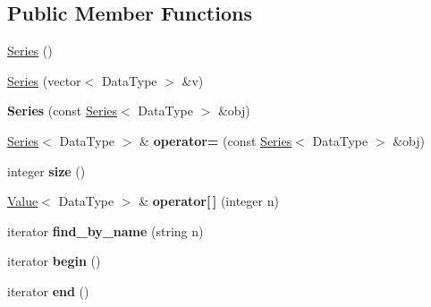 \subsection*{Public Member Functions}
\begin{DoxyCompactItemize}
\item 
\hyperlink{classez_1_1maths_1_1Series_a53985929bac84b0bde2294088e14f175}{Series} ()
\item 
\hyperlink{classez_1_1maths_1_1Series_ad52dec35d6341c5e6971bd24c70fe585}{Series} (vector$<$ Data\+Type $>$ \&v)
\item 
\mbox{\label{classez_1_1maths_1_1Series_a38a4586f46c7a51989206fb69a6c345f}} 
{\bfseries Series} (const \hyperlink{classez_1_1maths_1_1Series}{Series}$<$ Data\+Type $>$ \&obj)
\item 
\mbox{\label{classez_1_1maths_1_1Series_aaee5e146acbd2c0fc89cc777dc3cc891}} 
\hyperlink{classez_1_1maths_1_1Series}{Series}$<$ Data\+Type $>$ \& {\bfseries operator=} (const \hyperlink{classez_1_1maths_1_1Series}{Series}$<$ Data\+Type $>$ \&obj)
\item 
\mbox{\label{classez_1_1maths_1_1Series_a91899948fba6b804489fd0a99ad3b3a6}} 
integer {\bfseries size} ()
\item 
\mbox{\label{classez_1_1maths_1_1Series_a676d36ad13a7114c730a24d224b024de}} 
\hyperlink{classez_1_1maths_1_1Value}{Value}$<$ Data\+Type $>$ \& {\bfseries operator\mbox{[}$\,$\mbox{]}} (integer n)
\item 
\mbox{\label{classez_1_1maths_1_1Series_a3232e2fc63ed3b1839b764fadef2b414}} 
iterator {\bfseries find\+\_\+by\+\_\+name} (string n)
\item 
\mbox{\label{classez_1_1maths_1_1Series_a43a122938300f3844f53f3dc3c61dddd}} 
iterator {\bfseries begin} ()
\item 
\mbox{\label{classez_1_1maths_1_1Series_ae97b3663ff1b5d0bd86f7c0bdde452b6}} 
iterator {\bfseries end} ()
\item 
\mbox{\label{classez_1_1maths_1_1Series_aea40980b9162417d6803827553c00ef3}} 

\end{DoxyCompactItemize}
